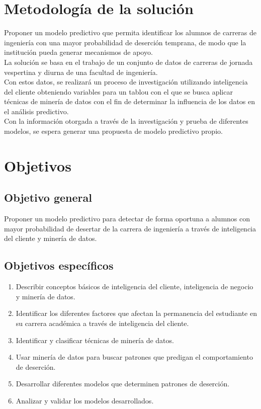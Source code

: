 \section{Metodología de la solución}
\label{sec:descripcion}

Proponer un modelo predictivo que permita identificar los alumnos de carreras de ingeniería con una mayor probabilidad de deserción temprana, de modo que la institución pueda generar mecanismos de apoyo.\\

La solución se basa en el trabajo de un conjunto de datos de carreras de jornada vespertina y diurna de una facultad de ingeniería.\\

Con estos datos, se realizará un proceso de investigación utilizando inteligencia del cliente obteniendo variables para un tablou con el que se busca aplicar técnicas de minería de datos con el fin de determinar la influencia de los datos en el análisis predictivo.\\

Con la información otorgada a través de la investigación y prueba de diferentes modelos, se espera generar una propuesta de modelo predictivo propio. \\


\section{Objetivos}
\label{sec:objetivos}

\subsection{Objetivo general}

Proponer un modelo predictivo para detectar de forma oportuna a alumnos con mayor probabilidad de desertar de la carrera de ingeniería a través de inteligencia del cliente y minería de datos.

\subsection{Objetivos específicos}

\begin{enumerate}
\item Describir conceptos básicos de inteligencia del cliente, inteligencia de negocio y minería de datos.
\item Identificar los diferentes factores que afectan la permanencia del estudiante en su carrera académica a través de inteligencia del cliente.
\item Identificar y clasificar técnicas de minería de datos.
\item Usar minería de datos para buscar patrones que predigan el comportamiento de deserción.
\item Desarrollar diferentes modelos que determinen patrones de deserción.
\item Analizar y validar los modelos desarrollados.

\end{enumerate}

